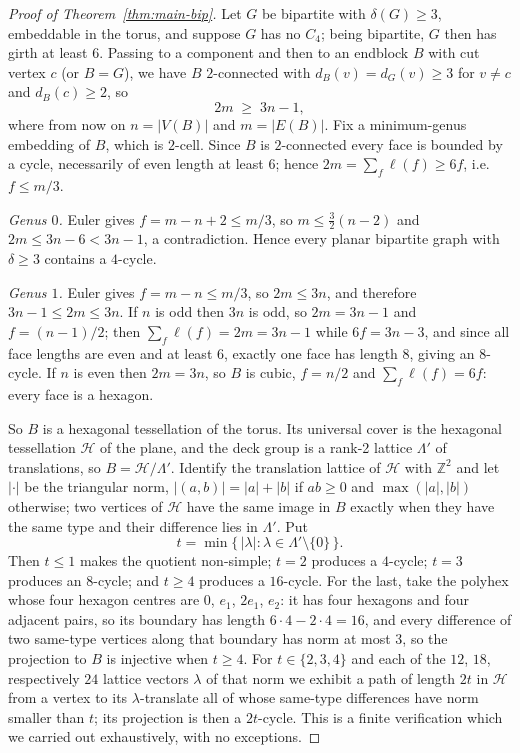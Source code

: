 \documentclass[11pt]{article}
\theoremstyle{plain}
\theoremstyle{definition}
\newcommand{\Cfour}{C_4}
\begin{document}
\begin{proof}[Proof of Theorem~\ref{thm:main-bip}]
Let $G$ be bipartite with $\delta(G)\ge3$, embeddable in the torus, and suppose
$G$ has no $\Cfour$; being bipartite, $G$ then has girth at least $6$. Passing
to a component and then to an endblock $B$ with cut vertex $c$ (or $B=G$), we
have $B$ $2$-connected with $d_B(v)=d_G(v)\ge3$ for $v\ne c$ and $d_B(c)\ge2$,
so
\[
  2m\;\ge\;3n-1,
\]
where from now on $n=|V(B)|$ and $m=|E(B)|$. Fix a minimum-genus embedding of
$B$, which is $2$-cell. Since $B$ is $2$-connected every face is bounded by a
cycle, necessarily of even length at least $6$; hence $2m=\sum_f\ell(f)\ge6f$,
i.e.\ $f\le m/3$.

\emph{Genus $0$.} Euler gives $f=m-n+2\le m/3$, so $m\le\tfrac32(n-2)$ and
$2m\le3n-6<3n-1$, a contradiction. Hence every planar bipartite graph with
$\delta\ge3$ contains a $4$-cycle.

\emph{Genus $1$.} Euler gives $f=m-n\le m/3$, so $2m\le3n$, and therefore
$3n-1\le2m\le3n$. If $n$ is odd then $3n$ is odd, so $2m=3n-1$ and
$f=(n-1)/2$; then $\sum_f\ell(f)=2m=3n-1$ while $6f=3n-3$, and since all face
lengths are even and at least $6$, exactly one face has length $8$, giving an
$8$-cycle. If $n$ is even then $2m=3n$, so $B$ is cubic, $f=n/2$ and
$\sum_f\ell(f)=6f$: every face is a hexagon.

So $B$ is a hexagonal tessellation of the torus. Its universal cover is the
hexagonal tessellation $\mathcal H$ of the plane, and the deck group is a rank-2
lattice $\Lambda'$ of translations, so $B=\mathcal H/\Lambda'$. Identify the
translation lattice of $\mathcal H$ with $\mathbb Z^2$ and let $|\cdot|$ be the
triangular norm, $|(a,b)|=|a|+|b|$ if $ab\ge0$ and $\max(|a|,|b|)$ otherwise;
two vertices of $\mathcal H$ have the same image in $B$ exactly when they have
the same type and their difference lies in $\Lambda'$. Put
\[
  t=\min\{\,|\lambda| : \lambda\in\Lambda'\setminus\{0\}\,\}.
\]
Then $t\le1$ makes the quotient non-simple; $t=2$ produces a $4$-cycle; $t=3$
produces an $8$-cycle; and $t\ge4$ produces a $16$-cycle. For the last, take the
polyhex whose four hexagon centres are $0$, $e_1$, $2e_1$, $e_2$: it has four
hexagons and four adjacent pairs, so its boundary has length
$6\cdot4-2\cdot4=16$, and every difference of two same-type vertices along that
boundary has norm at most $3$, so the projection to $B$ is injective when
$t\ge4$. For $t\in\{2,3,4\}$ and each of the $12$, $18$, respectively $24$
lattice vectors $\lambda$ of that norm we exhibit a path of length $2t$ in
$\mathcal H$ from a vertex to its $\lambda$-translate all of whose same-type
differences have norm smaller than $t$; its projection is then a $2t$-cycle. This
is a finite verification which we carried out exhaustively, with no exceptions.
\end{proof}
\end{document}
